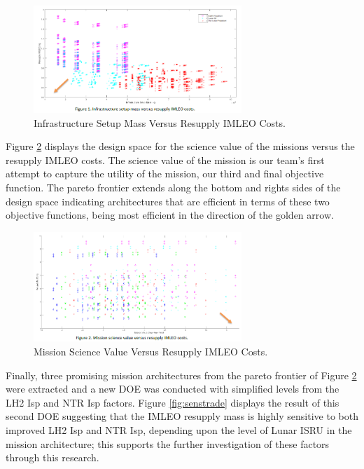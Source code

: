 \documentclass[]{aiaa-pretty}
\begin{document}
\begin{figure}[h!]
	\centering
	\includegraphics[width=0.7\textwidth]{InfraTrade}
	\caption{Infrastructure Setup Mass Versus Resupply IMLEO Costs.}
	\label{fig:infratrade}
\end{figure}

Figure \ref{fig:fulltrade} displays the design space for the science value of the missions versus the resupply IMLEO costs. The science value of the mission is our team’s first attempt to capture the utility of the mission, our third and final objective function. The pareto frontier extends along the bottom and rights sides of the design space indicating architectures that are efficient in terms of these two objective functions, being most efficient in the direction of the golden arrow.

\begin{figure}[h!]
	\centering
	\includegraphics[width=0.7\textwidth]{fulltrade}
	\caption{Mission Science Value Versus Resupply IMLEO Costs.}
	\label{fig:fulltrade}
\end{figure}

Finally, three promising mission architectures from the pareto frontier of Figure \ref{fig:fulltrade} were extracted and a new DOE was conducted with simplified levels from the LH2 Isp and NTR Isp factors. Figure \ref{fig:senstrade} displays the result of this second DOE suggesting that the IMLEO resupply mass is highly sensitive to both improved LH2 Isp and NTR Isp, depending upon the level of Lunar ISRU in the mission architecture; this supports the further investigation of these factors through this research.
\end{document}
